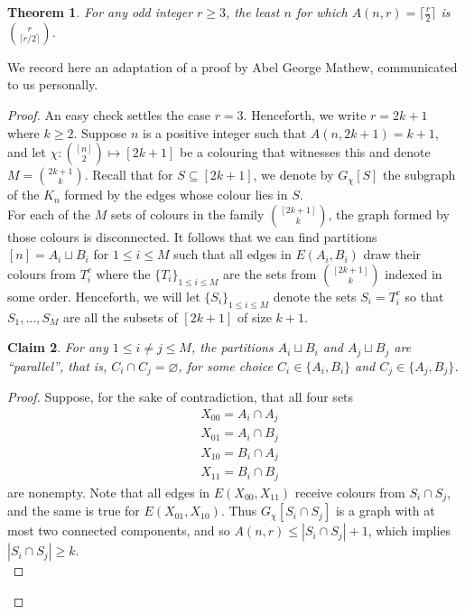 \documentclass[11pt,a4paper]{article}
\newtheorem{theorem}{Theorem}[section]
\newtheorem{claim}[theorem]{Claim}
\begin{document}
\begin{theorem}
\label{thm:4:1}
For any odd integer $r \geq 3$, the least $n$ for which $A(n,r)= \lceil \frac{r}{2} \rceil$ is $\binom{r}{\lceil r/2 \rceil}$.
\end{theorem}
\noindent
We record here an adaptation of a proof by Abel George Mathew, communicated to us personally. 
\begin{proof}
An easy check settles the case $r = 3$. Henceforth, we write $r = 2k+1$ where $k \geq 2$. Suppose $n$ is a positive integer such that $A(n, 2k+1) = k+1$, and let $\chi : \binom{[n]}{2} \mapsto [2k+1]$ be a colouring that witnesses this and denote $M = \binom{2k+1}{k}$. Recall that for $S \subseteq [2k+1]$, we denote by $G_{\chi}[S]$ the subgraph of the $K_n$ formed by the edges whose colour lies in $S$. \\

\noindent
For each of the $M$ sets of colours in the family $\binom{[2k+1]}{k}$, the graph formed by those colours is disconnected. It follows that we can find partitions $[n] = A_i \sqcup B_i$ for $1 \leq i \leq M$ such that all edges in $E(A_i, B_i)$ draw their colours from $T_i^{c}$ where the $\{T_i\}_{1 \leq i \leq M}$ are the sets from $\binom{[2k+1]}{k}$ indexed in some order. Henceforth, we will let $\{S_i\}_{1 \leq i \leq M}$ denote the sets $S_i = T_i^{c}$ so that $S_1, \dots, S_M$ are all the subsets of $[2k+1]$ of size $k+1$.
\begin{claim}
\label{claim:4:2}
For any $1 \leq i \ne j \leq M$, the partitions $A_i \sqcup B_i$ and $A_j \sqcup B_j$ are ``parallel'', that is, $C_i \cap C_j = \varnothing$, for some choice $C_i \in \{A_i, B_i\}$ and $C_j \in \{A_j,B_j\}$.
\end{claim}
\begin{proof}
Suppose, for the sake of contradiction, that all four sets 
\begin{align*}
    & X_{00} = A_i \cap A_j \\ & X_{01} = A_i \cap B_j \\ & X_{10} = B_i \cap A_j \\ &X_{11} = B_i \cap B_j
\end{align*}
are nonempty. Note that all edges in $E(X_{00}, X_{11})$ receive colours from $S_i \cap S_j$, and the same is true for $E(X_{01}, X_{10})$. Thus $G_{\chi}[S_i \cap S_j]$ is a graph with at most two connected components, and so $A(n,r) \leq |S_i \cap S_j| + 1$, which implies $|S_i \cap S_j| \geq k$. \\


\end{proof}
\end{proof}
\end{document}

